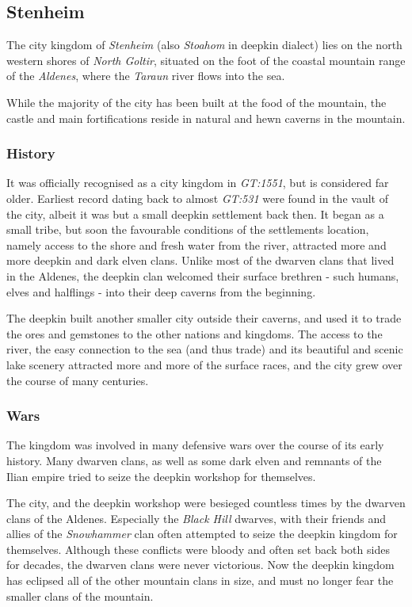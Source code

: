 \subsection{Stenheim}
\label{sec:Stenheim}

The city kingdom of \emph{Stenheim} (also \emph{Stoahom} in deepkin dialect)
lies on the north western shores of \emph{North Goltir}, situated on the foot of
the coastal mountain range of the \emph{Aldenes}, where the \emph{Taraun}
river flows into the sea.

While the majority of the city has been built at the food of the mountain, the
castle and main fortifications reside in natural and hewn caverns in the
mountain.

\subsubsection{History}

It was officially recognised as a city kingdom in \emph{GT:1551}, but is
considered far older. Earliest record dating back to almost \emph{GT:531}
were found in the vault of the city, albeit it was but a small deepkin
settlement back then. It began as a small tribe, but soon the favourable
conditions of the settlements location, namely access to the shore and
fresh water from the river, attracted more and more deepkin and dark elven
clans. Unlike most of the dwarven clans that lived in the Aldenes, the deepkin
clan welcomed their surface brethren - such humans, elves and halflings - into
their deep caverns from the beginning.

The deepkin built another smaller city outside their caverns, and used it to
trade the ores and gemstones to the other nations and kingdoms. The access to
the river, the easy connection to the sea (and thus trade) and its beautiful
and scenic lake scenery attracted more and more of the surface races, and the
city grew over the course of many centuries.

\subsubsection{Wars}

The kingdom was involved in many defensive wars over the course of its early
history. Many dwarven clans, as well as some dark elven and remnants of the
Ilian empire tried to seize the deepkin workshop for themselves.

The city, and the deepkin workshop were besieged countless times by the dwarven
clans of the Aldenes. Especially the \emph{Black Hill} dwarves, with their
friends and allies of the \emph{Snowhammer} clan often attempted to seize
the deepkin kingdom for themselves. Although these conflicts were bloody and
often set back both sides for decades, the dwarven clans were never
victorious. Now the deepkin kingdom has eclipsed all of the other mountain
clans in size, and must no longer fear the smaller clans of the mountain.

